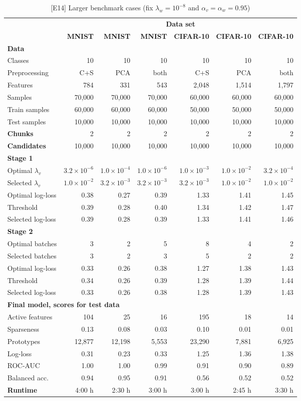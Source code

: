 %
\begin{table}
\caption{[E14] Larger benchmark cases (fix $\lambda_w=10^{-8}$ and $\alpha_v=\alpha_w=0.95$)}
\label{tab_e14}
%
\begin{center}
\small
\begin{tabular}{|lrrrrrr|}
\hline
&\multicolumn{6}{c|}{\textbf{\hrulefill\ Data set \hrulefill}}\\
&\textbf{MNIST}&\textbf{MNIST}&\textbf{MNIST}&\textbf{CIFAR-10}&\textbf{CIFAR-10}&\textbf{CIFAR-10}\\
\multicolumn{7}{|l|}{\textbf{Data}}\\
Classes&10&10&10&10&10&10\\
Preprocessing&C+S&PCA&both&C+S&PCA&both\\
Features&784&331&543&2,048&1,514&1,797\\
Samples&70,000&70,000&70,000&60,000&60,000&60,000\\
Train samples&60,000&60,000&60,000&50,000&50,000&50,000\\
Test samples&10,000&10,000&10,000&10,000&10,000&10,000\\
\textbf{Chunks}&2&2&2&2&2&2\\
\textbf{Candidates}&10,000&10,000&10,000&10,000&10,000&10,000\\
\multicolumn{7}{|l|}{\textbf{Stage 1}}\\
Optimal $\lambda_v$&$3.2\times10^{-6}$&$1.0\times10^{-4}$&$1.0\times10^{-6}$&$1.0\times10^{-3}$&$1.0\times10^{-2}$&$3.2\times10^{-4}$\\
Selected $\lambda_v$&$1.0\times10^{-2}$&$3.2\times10^{-3}$&$3.2\times10^{-3}$&$3.2\times10^{-3}$&$1.0\times10^{-2}$&$1.0\times10^{-2}$\\
Optimal log-loss&0.38&0.27&0.39&1.33&1.41&1.45\\
Threshold&0.39&0.28&0.40&1.34&1.42&1.47\\
Selected log-loss&0.39&0.28&0.39&1.33&1.41&1.46\\
\multicolumn{7}{|l|}{\textbf{Stage 2}}\\
Optimal batches&3&2&5&8&4&2\\
Selected batches&3&2&3&5&2&2\\
Optimal log-loss&0.33&0.26&0.38&1.27&1.38&1.43\\
Threshold&0.34&0.26&0.39&1.28&1.39&1.44\\
Selected log-loss&0.33&0.26&0.38&1.28&1.39&1.43\\
\multicolumn{7}{|l|}{\textbf{Final model, scores for test data}}\\
Active features&104&25&16&195&18&14\\
Sparseness&0.13&0.08&0.03&0.10&0.01&0.01\\
Prototypes&12,877&12,198&5,553&23,290&7,881&6,925\\
Log-loss&0.31&0.23&0.33&1.25&1.36&1.38\\
ROC-AUC&1.00&1.00&0.99&0.91&0.90&0.89\\
Balanced acc.&0.94&0.95&0.91&0.56&0.52&0.52\\
\textbf{Runtime}&4:00 h&2:30 h&3:00 h&3:00 h&2:45 h&3:30 h\\
\hline
\end{tabular}
\end{center}
\end{table}
